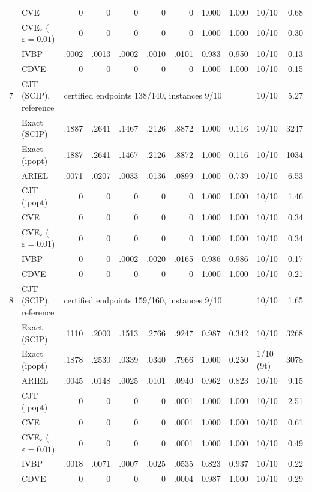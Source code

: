 \begin{table}[htbp]
\begin{tabular}{rlrrrrrrrlr}
 & CVE & 0 & 0 & 0 & 0 & 0 & 1.000 & 1.000 & 10/10 & 0.68 \\
 & CVE$_\varepsilon$ ($\varepsilon{=}0.01$) & 0 & 0 & 0 & 0 & 0 & 1.000 & 1.000 & 10/10 & 0.30 \\
 & IVBP & .0002 & .0013 & .0002 & .0010 & .0101 & 0.983 & 0.950 & 10/10 & 0.13 \\
 & CDVE & 0 & 0 & 0 & 0 & 0 & 1.000 & 1.000 & 10/10 & 0.15 \\
\midrule
7 & CJT (SCIP), reference & \multicolumn{7}{l}{certified endpoints 138/140, instances 9/10} & 10/10 & 5.27 \\
 & Exact (SCIP) & .1887 & .2641 & .1467 & .2126 & .8872 & 1.000 & 0.116 & 10/10 & 3247 \\
 & Exact (ipopt) & .1887 & .2641 & .1467 & .2126 & .8872 & 1.000 & 0.116 & 10/10 & 1034 \\
 & ARIEL & .0071 & .0207 & .0033 & .0136 & .0899 & 1.000 & 0.739 & 10/10 & 6.53 \\
 & CJT (ipopt) & 0 & 0 & 0 & 0 & 0 & 1.000 & 1.000 & 10/10 & 1.46 \\
 & CVE & 0 & 0 & 0 & 0 & 0 & 1.000 & 1.000 & 10/10 & 0.34 \\
 & CVE$_\varepsilon$ ($\varepsilon{=}0.01$) & 0 & 0 & 0 & 0 & 0 & 1.000 & 1.000 & 10/10 & 0.34 \\
 & IVBP & 0 & 0 & .0002 & .0020 & .0165 & 0.986 & 0.986 & 10/10 & 0.17 \\
 & CDVE & 0 & 0 & 0 & 0 & 0 & 1.000 & 1.000 & 10/10 & 0.21 \\
\midrule
8 & CJT (SCIP), reference & \multicolumn{7}{l}{certified endpoints 159/160, instances 9/10} & 10/10 & 1.65 \\
 & Exact (SCIP) & .1110 & .2000 & .1513 & .2766 & .9247 & 0.987 & 0.342 & 10/10 & 3268 \\
 & Exact (ipopt) & .1878 & .2530 & .0339 & .0340 & .7966 & 1.000 & 0.250 & 1/10 (9t) & 3078 \\
 & ARIEL & .0045 & .0148 & .0025 & .0101 & .0940 & 0.962 & 0.823 & 10/10 & 9.15 \\
 & CJT (ipopt) & 0 & 0 & 0 & 0 & .0001 & 1.000 & 1.000 & 10/10 & 2.51 \\
 & CVE & 0 & 0 & 0 & 0 & .0001 & 1.000 & 1.000 & 10/10 & 0.61 \\
 & CVE$_\varepsilon$ ($\varepsilon{=}0.01$) & 0 & 0 & 0 & 0 & .0001 & 1.000 & 1.000 & 10/10 & 0.49 \\
 & IVBP & .0018 & .0071 & .0007 & .0025 & .0535 & 0.823 & 0.937 & 10/10 & 0.22 \\
 & CDVE & 0 & 0 & 0 & 0 & .0004 & 0.987 & 1.000 & 10/10 & 0.29 \\

\end{tabular}
\end{table}
